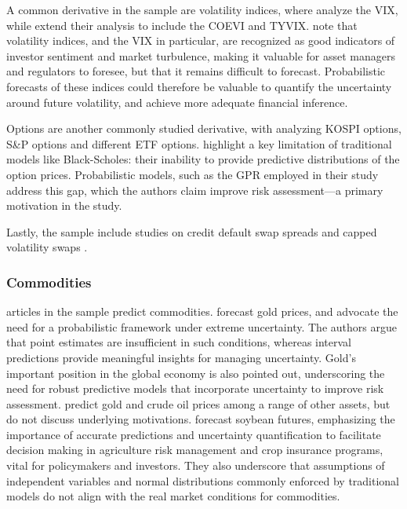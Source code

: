A common derivative in the sample are volatility indices, where \textcite{hortua2024forecasting, Daniali2021} analyze the VIX, while \textcite{Tian2023} extend their analysis to include the COEVI and TYVIX. \textcite{hortua2024forecasting} note that volatility indices, and the VIX in particular, are recognized as good indicators of investor sentiment and market turbulence, making it valuable for asset managers and regulators to foresee, but that it remains difficult to forecast. Probabilistic forecasts of these indices could therefore be valuable to quantify the uncertainty around future volatility, and achieve more adequate financial inference.

Options are another commonly studied derivative, with \textcite{Park2014gpr} analyzing KOSPI options, \textcite{DeSpiegeleer2018gpr} S\&P options and \textcite{tang2024period} different ETF options. \textcite{Park2014gpr} highlight a key limitation of traditional models like Black-Scholes: their inability to provide predictive distributions of the option prices. Probabilistic models, such as the GPR employed in their study address this gap, which the authors claim improve risk assessment—a primary motivation in the study. 

Lastly, the sample include studies on credit default swap spreads \parencite{Law2017Practical} and capped volatility swaps \parencite{Hocht2024gpr}. 


\subsubsection{Commodities}
\commoditiesarticles articles in the sample predict commodities.
\textcite{Wang2024GoldForecasting} forecast gold prices, and advocate the need for a probabilistic framework under extreme uncertainty. The authors argue that point estimates are insufficient in such conditions, whereas interval predictions provide meaningful insights for managing uncertainty. Gold's important position in the global economy is also pointed out, underscoring the need for robust predictive models that incorporate uncertainty to improve risk assessment. \textcite{Law2017Practical} predict gold and crude oil prices among a range of other assets, but do not discuss underlying motivations. \textcite{li2020multivariate} forecast soybean futures, emphasizing the importance of accurate predictions and uncertainty quantification to facilitate decision making in agriculture risk management and crop insurance programs, vital for policymakers and investors. They also underscore that assumptions of independent variables and normal distributions commonly enforced by traditional models do not align with the real market conditions for commodities.


